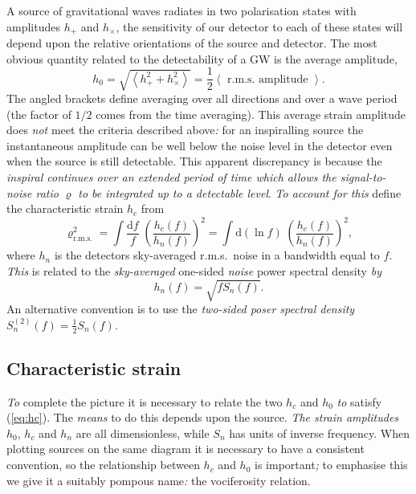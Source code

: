 A source of gravitational waves radiates in two polarisation states with amplitudes $h_{+}$ and $h_{\times}$, the sensitivity of our detector to each of these states will depend upon the relative orientations of the source and detector. The most obvious quantity related to the detectability of a GW is the average amplitude,
\begin{equation}
\label{eq:h0} h_{0} = \sqrt{\left< h_{+}^{2}+h_{\times}^{2} \right>}=\frac{1}{2}\left< \textrm{ r.m.s. amplitude } \right>.
\end{equation}
The angled brackets define averaging over all directions and over a wave period (the factor of $1/2$ comes from the time averaging). This average strain amplitude does \emph{not} meet the criteria described above\emph{:} for an inspiralling source the instantaneous amplitude can be well below the noise level in the detector even when the source is still detectable. This apparent discrepancy is because the \emph{inspiral continues over an extended period of time which allows the signal-to-noise ratio} $\varrho$ \emph{to be integrated up to a detectable level}. \emph{To account for this} \citet{FinnThorne} define the characteristic strain $h_{c}$ from
\begin{equation}\label{eq:hc}
\varrho_{\textrm{r.m.s.}}^{2} = \int \frac{\textrm{d}f}{f}\; \left(\frac{h_{c}(f)}{h_{n}(f)}\right)^{2} = \int \textrm{d}\left(\ln f\right)\; \left(\frac{h_{c}(f)}{h_{n}(f)}\right)^{2},
\end{equation}
where $h_{n}$ is the detectors sky-averaged r.m.s.\ noise in a bandwidth equal to $f$. \emph{This} is related to the \emph{sky-averaged} one-sided \emph{noise} power spectral density \emph{by}
\begin{equation}\label{eq:powerspectraldensity}
h_{n}(f)=\sqrt{fS_{n}(f)}.
\end{equation}
An alternative convention is to use the \emph{two-sided poser spectral density} $S^{(2)}_{n}(f)=\frac{1}{2}S_{n}(f)$.

\subsection{Characteristic strain}

\emph{To} complete the picture it is necessary to relate the two $h_{c}$ and $h_{0}$ \emph{to} satisfy (\ref{eq:hc}). The \emph{means} to do this depends upon the source. \emph{The strain amplitudes} $h_{0}$, $h_{c}$ and $h_{n}$ are all dimensionless, while $S_{n}$ has units of inverse frequency. When plotting sources on the same diagram it is necessary to have a consistent convention, so the relationship between $h_{c}$ and $h_{0}$ is important\emph{;} to emphasise this we give it a suitably pompous name\emph{:} the vociferosity relation.

